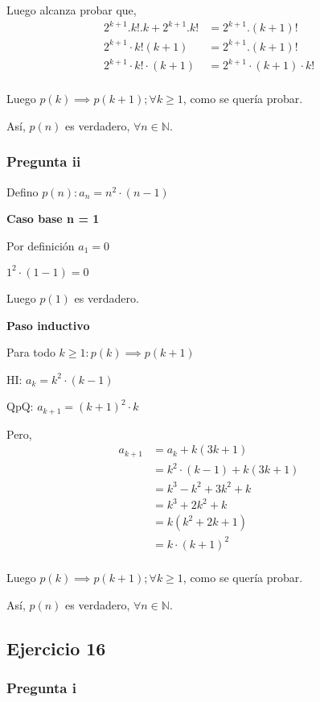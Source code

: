 Luego alcanza probar que,
\begin{align*}
    2^{k+1}.k!.k + 2^{k+1}.k! &= 2^{k+1}.(k+1)! \\
    2^{k+1}\cdot k!(k+1) &= 2^{k+1}.(k+1)! \\
    2^{k+1}\cdot k!\cdot (k+1) &= 2^{k+1}\cdot (k+1)\cdot k! \\
\end{align*}

Luego $p(k) \implies p(k+1); \forall k \geq 1$, como se quería probar.

Así, $p(n)$ es verdadero, $\forall n \in \mathbb{N}$.

\subsubsection{Pregunta ii}

Defino $ p(n): a_n = n^2\cdot (n-1) $

\textbf{Caso base n = 1}

Por definición $a_1 = 0$

$ 1^2\cdot (1-1) = 0 $

Luego $ p(1) $ es verdadero.

\textbf{Paso inductivo}

Para todo $k \geq 1: p(k) \implies p(k+1)$

HI: $ a_k = k^2\cdot (k-1)$

QpQ: $ a_{k+1} = (k+1)^2\cdot k$

Pero,
\begin{align*}
    a_{k+1} &= a_k + k(3k+1) \\
    &= k^2\cdot (k-1) + k(3k+1) \\
    &= k^3 - k^2 + 3k^2+k \\
    &= k^3 +2k^2+k \\
    &= k(k^2 + 2k + 1)\\
    &= k\cdot (k+1)^2\\
\end{align*}

Luego $p(k) \implies p(k+1); \forall k \geq 1$, como se quería probar.

Así, $p(n)$ es verdadero, $\forall n \in \mathbb{N}$.

\subsection{Ejercicio 16}

\subsubsection{Pregunta i}

